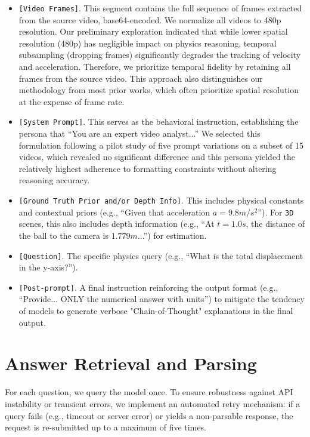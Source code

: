 \begin{itemize}
    \item \texttt{[Video Frames]}. This segment contains the full sequence of frames extracted from the source video, base64-encoded. We normalize all videos to 480p resolution. Our preliminary exploration indicated that while lower spatial resolution (480p) has negligible impact on physics reasoning, temporal subsampling (dropping frames) significantly degrades the tracking of velocity and acceleration. Therefore, we prioritize {temporal fidelity} by retaining all frames from the source video. This approach also distinguishes our methodology from most prior works, which often prioritize spatial resolution at the expense of frame rate.
    
    \item \texttt{[System Prompt]}. This serves as the behavioral instruction, establishing the persona that ``You are an expert video analyst...'' We selected this formulation following a pilot study of five prompt variations on a subset of 15 videos, which revealed no significant difference and this persona yielded the relatively highest adherence to formatting constraints without altering reasoning accuracy.
    
    \item \texttt{[Ground Truth Prior and/or Depth Info]}. This includes physical constants and contextual priors (e.g., ``Given that acceleration $a = 9.8 m/s^2$''). For \texttt{3D} scenes, this also includes depth information (e.g., ``At $t=1.0s$, the distance of the ball to the camera is $1.779m$...'') for estimation.
    
    \item \texttt{[Question]}. The specific physics query (e.g., ``What is the total displacement in the y-axis?'').
    
    \item \texttt{[Post-prompt]}. A final instruction reinforcing the output format (e.g., ``Provide... ONLY the numerical answer with units'') to mitigate the tendency of models to generate verbose "Chain-of-Thought" explanations in the final output.
\end{itemize}

\section{Answer Retrieval and Parsing} \label{sec:parsing}

For each question, we query the model once. To ensure robustness against API instability or transient errors, we implement an automated retry mechanism: if a query fails (e.g., timeout or server error) or yields a non-parsable response, the request is re-submitted up to a maximum of five times.

